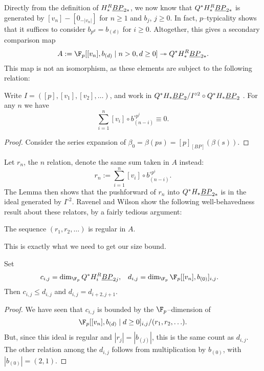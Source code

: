 Directly from the definition of $H_*^R \underline{\smash{BP}}_{2*}$, we now know that $Q^* H_*^R \underline{\smash{BP}}_{2*}$ is generated by $[v_n] - [0_{-|v_n|}]$ for $n \ge 1$ and $b_j$, $j \ge 0$.  In fact, $p$--typicality shows~\cite[Lemma 4.14]{RavenelWilsonHopfRingForMU} that it suffices to consider $b_{p^d} = b_{(d)}$ for $i \ge 0$.  Altogether, this gives a secondary comparison map \[A := \F_p[[v_n], b_{(d)} \mid n > 0, d \ge 0] \onto Q^* H_*^R \OS{BP}{2*}.\]  This map is not an isomorphism, as these elements are subject to the following relation:

\begin{lemma}
Write $I = ([p], [v_1], [v_2], \ldots)$, and work in $Q^* H_* \underline{\smash{BP}}_{2} / I^{\circ 2} \circ Q^* H_* \underline{\smash{BP}}_{2}$ .  For any $n$ we have \[\sum_{i=1}^n [v_i] \circ b_{(n-i)}^{\circ p^i} \equiv 0.\]
\end{lemma}
\begin{proof}
Consider the series expansion of $\beta_0 = \beta(ps) = [p]_{[BP]}(\beta(s))$.
\end{proof}

Let $r_n$, the $n${\th} relation, denote the same sum taken in $A$ instead: \[r_n := \sum_{i=1}^n [v_i] \circ b_{(n-i)}^{\circ p^i}.\]   The Lemma then shows that the pushforward of $r_n$ into $Q^* H_* \underline{\smash{BP}}_{2*}$ is in the ideal generated by $I^{\circ 2}$.  Ravenel and Wilson show the following well-behavedness result about these relators, by a fairly tedious argument:

\begin{lemma}
The sequence $(r_1, r_2, \ldots)$ is regular in $A$. \qedhere
\end{lemma}

\noindent This is exactly what we need to get our size bound.

\begin{lemma}
Set
\begin{align*}
c_{i,j} & = \dim_{\F_p} Q^* H_i^R \OS{BP}{2j}, &
d_{i,j} & = \dim_{\F_p} \F_p[[v_n], b_{(0)}]_{i,j}.
\end{align*}
Then $c_{i,j} \le d_{i,j}$ and $d_{i,j} = d_{i+2,j+1}$.
\end{lemma}
\begin{proof}
We have seen that $c_{i,j}$ is bounded by the $\F_p$--dimension of \[\F_p[[v_n], b_{(d)} \mid d \ge 0]_{i,j} / (r_1, r_2, \ldots).\]  But, since this ideal is regular and $|r_j| = |b_{(j)}|$, this is the same count as $d_{i,j}$.  The other relation among the $d_{i,j}$ follows from multiplication by $b_{(0)}$, with $|b_{(0)}| = (2, 1)$.
\end{proof}

